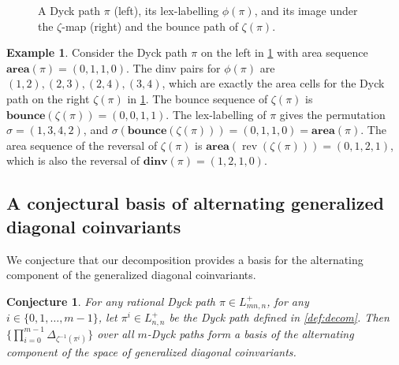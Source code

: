\documentclass[12pt,reqno]{amsart}
\newtheorem{conj}{Conjecture}
\theoremstyle{definition}
\newtheorem{example}{Example}
\newcommand{\aarea}{\mathbf{area}}
\newcommand{\ddinv}{\mathbf{dinv}}
\newcommand{\bbounce}{\mathbf{bounce}}
\DeclareMathOperator{\rev}{rev}
\begin{document}
\begin{figure}[H]
\hspace{1cm}
\caption{A Dyck path $\pi$ (left), its lex-labelling $\phi(\pi)$, and its image under the $\zeta$-map (right) and the bounce path of $\zeta(\pi)$.}
\label{fig:zeta}
\end{figure}

\begin{example}
Consider the Dyck path $\pi$ on the left in \cref{fig:zeta} with area sequence $\aarea(\pi) = (0,1,1,0)$.
The dinv pairs for $\phi(\pi)$ are $(1,2),(2,3),(2,4),(3,4)$, which are exactly the area cells for the Dyck path on the right $\zeta(\pi)$ in \cref{fig:zeta}.
The bounce sequence of $\zeta(\pi)$ is $\bbounce(\zeta(\pi)) = (0,0,1,1)$. The lex-labelling of $\pi$ gives the permutation $\sigma = (1,3,4,2)$, and $\sigma(\bbounce(\zeta(\pi))) = (0,1,1,0) = \aarea(\pi)$.
The area sequence of the reversal of $\zeta(\pi)$ is $\aarea(\rev(\zeta(\pi))) = (0,1,2,1)$, which is also the reversal of $\ddinv(\pi) = (1,2,1,0)$.
\end{example}

\subsection{A conjectural basis of alternating generalized diagonal coinvariants}

We conjecture that our decomposition provides a basis for the alternating component of the generalized diagonal coinvariants.
\begin{conj}\label{thm:main2}
For any rational Dyck path $\pi \in L_{mn,n}^+$, for any $i \in \{0,1,\dots,m-1\}$,  let $\pi^i \in L_{n,n}^+$ be the Dyck path defined in \cref{def:decom}.
Then $\{\prod_{i=0}^{m-1} \Delta_{\zeta^{-1}(\pi^i)}\}$ over all $m$-Dyck paths form a basis of the alternating component of the space of generalized diagonal coinvariants.
\end{conj}
\end{document}
